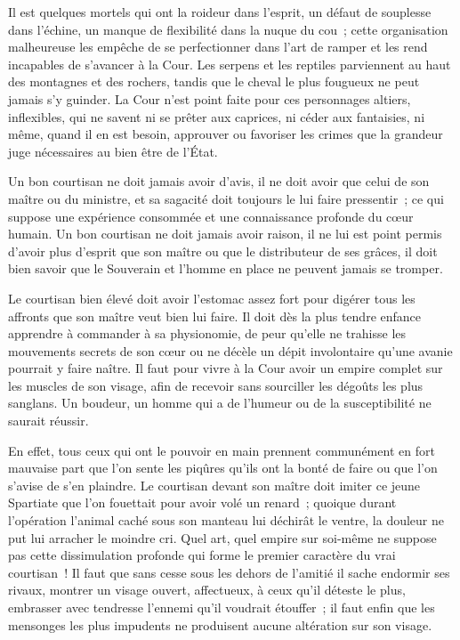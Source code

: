 \documentclass[french,twoside]{book} %
\begin{document}
Il est quelques mortels qui ont la roideur dans l’esprit, un défaut de souplesse dans l’échine, un manque de flexibilité dans la nuque du cou ; cette organisation malheureuse les empêche de se perfectionner dans l’art de ramper et les rend incapables de s’avancer à la Cour. Les serpens et les reptiles parviennent au haut des montagnes et des rochers, tandis que le cheval le plus fougueux ne peut jamais s’y guinder. La Cour n’est point faite pour ces personnages altiers, inflexibles, qui ne savent ni se prêter aux caprices, ni céder aux fantaisies, ni même, quand il en est besoin, approuver ou favoriser les crimes que la grandeur juge nécessaires au bien être de l’État.\par
Un bon courtisan ne doit jamais avoir d’avis, il ne doit avoir que celui de son maître ou du ministre, et sa sagacité doit toujours le lui faire pressentir ; ce qui suppose une expérience consommée et une connaissance profonde du cœur humain. Un bon courtisan ne doit jamais avoir raison, il ne lui est point permis d’avoir plus d’esprit que son maître ou que le distributeur de ses grâces, il doit bien savoir que le Souverain et l’homme en place ne peuvent jamais se tromper.\par
Le courtisan bien élevé doit avoir l’estomac assez fort pour digérer tous les affronts que son maître veut bien lui faire. Il doit dès la plus tendre enfance apprendre à commander à sa physionomie, de peur qu’elle ne trahisse les mouvements secrets de son cœur ou ne décèle un dépit involontaire qu’une avanie pourrait y faire naître. Il faut pour vivre à la Cour avoir un empire complet sur les muscles de son visage, afin de recevoir sans sourciller les dégoûts les plus sanglans. Un boudeur, un homme qui a de l’humeur ou de la susceptibilité ne saurait réussir.\par
En effet, tous ceux qui ont le pouvoir en main prennent communément en fort mauvaise part que l’on sente les piqûres qu’ils ont la bonté de faire ou que l’on s’avise de s’en plaindre. Le courtisan devant son maître doit imiter ce jeune Spartiate que l’on fouettait pour avoir volé un renard ; quoique durant l’opération l’animal caché sous son manteau lui déchirât le ventre, la douleur ne put lui arracher le moindre cri. Quel art, quel empire sur soi-même ne suppose pas cette dissimulation profonde qui forme le premier caractère du vrai courtisan ! Il faut que sans cesse sous les dehors de l’amitié il sache endormir ses rivaux, montrer un visage ouvert, affectueux, à ceux qu’il déteste le plus, embrasser avec tendresse l’ennemi qu’il voudrait étouffer ; il faut enfin que les mensonges les plus impudents ne produisent aucune altération sur son visage.\par
\end{document}
